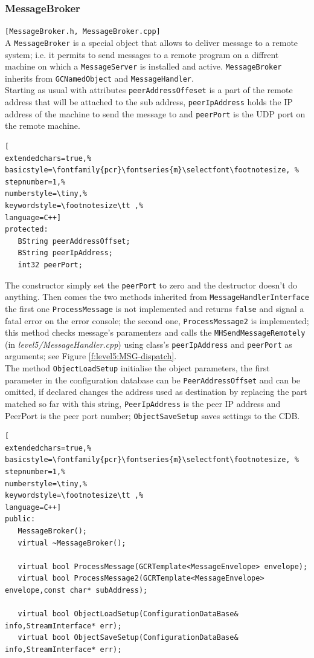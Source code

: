 \subsubsection{MessageBroker}
\texttt{[MessageBroker.h, MessageBroker.cpp]}\\
A \texttt{MessageBroker} is a special object that allows to deliver message to a remote system; i.e. it permits to send messages to a remote program on a diffrent machine on which a \texttt{MessageServer} is installed and active. \texttt{MessageBroker} inherits from \texttt{GCNamedObject} and \texttt{MessageHandler}.\\


Starting as usual with attributes \texttt{peerAddressOffeset} is a part of the remote address that will be attached to the sub address, \texttt{peerIpAddress} holds the IP address of the machine to send the message to and \texttt{peerPort} is the UDP port on the remote machine.
\begin{lstlisting}[
extendedchars=true,%
basicstyle=\fontfamily{pcr}\fontseries{m}\selectfont\footnotesize, %
stepnumber=1,%
numberstyle=\tiny,%
keywordstyle=\footnotesize\tt ,%
language=C++]
protected:
   BString peerAddressOffset;
   BString peerIpAddress;
   int32 peerPort;
\end{lstlisting}

The constructor simply set the \texttt{peerPort} to zero and the destructor doesn't do anything.
Then comes the two methods inherited from \texttt{MessageHandlerInterface} the first one \texttt{ProcessMessage} is not implemented and returns \texttt{false} and signal a fatal error on the error console; the second one, \texttt{ProcessMessage2} is implemented; this method checks message's paramenters and calls the \texttt{MHSendMessageRemotely} (in \textit{level5/MessageHandler.cpp}) using class's \texttt{peerIpAddress} and  \texttt{peerPort} as arguments; see Figure \ref{f:level5:MSG-dispatch}. \\


The method \texttt{ObjectLoadSetup} initialise the object parameters, the first parameter in the configuration database can be \texttt{PeerAddressOffset} and can be omitted, if declared changes the address used as destination by replacing the part matched so far with this string, \texttt{PeerIpAddress} is the peer IP address and PeerPort is the peer port number; \texttt{ObjectSaveSetup} saves settings to the CDB.
\begin{lstlisting}[
extendedchars=true,%
basicstyle=\fontfamily{pcr}\fontseries{m}\selectfont\footnotesize, %
stepnumber=1,%
numberstyle=\tiny,%
keywordstyle=\footnotesize\tt ,%
language=C++]
public:
   MessageBroker();
   virtual ~MessageBroker();

   virtual bool ProcessMessage(GCRTemplate<MessageEnvelope> envelope);
   virtual bool ProcessMessage2(GCRTemplate<MessageEnvelope> envelope,const char* subAddress);

   virtual bool ObjectLoadSetup(ConfigurationDataBase& info,StreamInterface* err);
   virtual bool ObjectSaveSetup(ConfigurationDataBase& info,StreamInterface* err);
\end{lstlisting}



